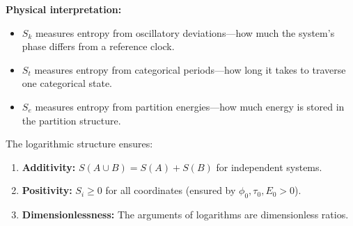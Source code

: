 \documentclass[twocolumn,10pt]{article}
\theoremstyle{remark}
\begin{document}
\textbf{Physical interpretation:}
\begin{itemize}
    \item $S_k$ measures entropy from oscillatory deviations—how much the system's phase differs from a reference clock.
    \item $S_t$ measures entropy from categorical periods—how long it takes to traverse one categorical state.
    \item $S_e$ measures entropy from partition energies—how much energy is stored in the partition structure.
\end{itemize}

The logarithmic structure ensures:
\begin{enumerate}
    \item \textbf{Additivity:} $S(A \cup B) = S(A) + S(B)$ for independent systems.
    \item \textbf{Positivity:} $S_i \geq 0$ for all coordinates (ensured by $\phi_0, \tau_0, E_0 > 0$).
    \item \textbf{Dimensionlessness:} The arguments of logarithms are dimensionless ratios.
\end{enumerate}
\end{document}
